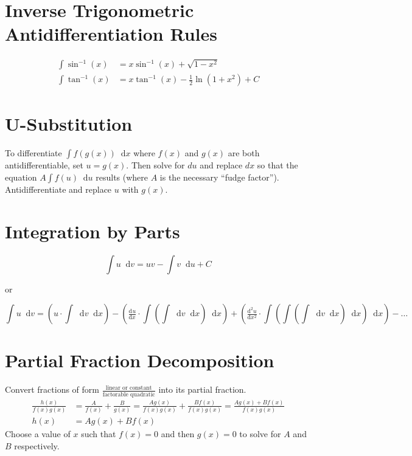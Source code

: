 \documentclass[12pt]{article}
\newcommand*{\rmaskip}{\setlength{\abovedisplayskip}{0pt}}
\newcommand*{\rmbskip}{\setlength{\belowdisplayskip}{0pt}}
\newcommand*{\rmskip}{\rmaskip \rmbskip}
\newcommand*{\isin}{\sin^{-1}}
\newcommand*{\itan}{\tan^{-1}}
\newcommand*{\dd}[3][]{\tfrac{\mathrm{d}^{#1}#2}{\mathrm{d}#3^{#1}}}
\newcommand*{\D}[1]{\mathop{}\!\mathrm{d} #1}
\begin{document}
\section*{Inverse Trigonometric Antidifferentiation Rules}
{\rmskip\begin{align*}
  \int \isin(x) &= x\isin(x) + \sqrt{1-x^2}\\
  \int \itan(x) &= x\itan(x) - \frac{1}{2} \ln(1 + x^2) + C
\end{align*}}%
\section*{U-Substitution}
To differentiate \(\int f(g(x)) \D{x}\) where \(f(x)\) and \(g(x)\) are both
antidifferentiable, set \(u = g(x)\). Then solve for \(du\) and replace \(dx\)
so that the equation \(A\int f(u) \D{u}\) results (where \(A\) is the necessary
``fudge factor''). Antidifferentiate and replace \(u\) with \(g(x)\).
\section*{Integration by Parts}
\[
  \int u \D{v} = uv - \int v \D{u} + C
\]

or

\[
  \int u \D{v} = \left(u \cdot \int \D{v} \D{x}\right) - \left(
    \dd{u}{x} \cdot \int \left( \int \D{v} \D{x} \right) \D{x}
    \right) + \left(\dd[2]{u}{x} \cdot \int \left( \int \left( \int \D{v}
    \D{x} \right) \D{x} \right) \D{x} \right) - \dots
\]
\section*{Partial Fraction Decomposition}
Convert fractions of form \(\frac{\text{linear or constant}}{\text{factorable
quadratic}}\) into its partial fraction.
\begin{align*}
  \frac{h(x)}{f(x)g(x)} &= \frac{A}{f(x)} + \frac{B}{g(x)} = \frac{Ag(x)}
  {f(x)g(x)} + \frac{Bf(x)}{f(x)g(x)} = \frac{Ag(x) + Bf(x)}{f(x)g(x)}\\
  h(x) &= Ag(x) + Bf(x)
\end{align*}
Choose a value of \(x\) such that \(f(x) = 0\) and then \(g(x) = 0\) to solve
for \(A\) and \(B\) respectively.
\end{document}
